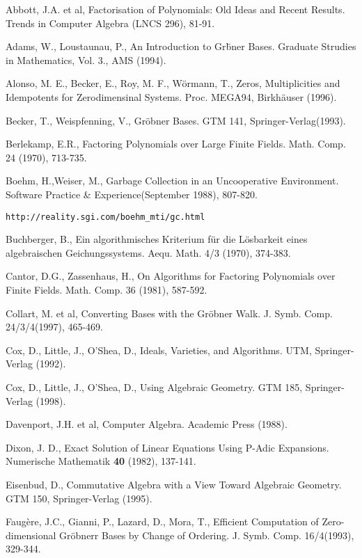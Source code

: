 \begin{thebibliography}{99}
Abbott, J.A. et al, Factorisation of Polynomials: Old Ideas and Recent Results.
Trends in Computer Algebra (LNCS 296), 81-91.

Adams, W., Loustaunau, P., An Introduction to Gr\"bner Bases. Graduate
Strudies in Mathematics, Vol. 3., AMS (1994).

Alonso, M. E., Becker, E., Roy, M. F., W\"ormann, T., Zeros,
Multiplicities and Idempotents for Zerodimensinal Systems.
Proc. MEGA94, Birkh\"auser (1996).

Becker, T., Weispfenning, V., Gr\"obner Bases. GTM 141, Springer-Verlag(1993).

Berlekamp, E.R., Factoring Polynomials over Large Finite Fields.
Math. Comp. 24 (1970), 713-735.

Boehm, H.,Weiser, M., Garbage Collection in an Uncooperative Environment.
Software Practice \& Experience(September 1988), 807-820.

{\tt http://reality.sgi.com/boehm\_mti/gc.html}

Buchberger, B., Ein algorithmisches Kriterium {f\"ur} die
{L\"osbarkeit} eines algebraischen Geichungssystems. Aequ. Math. 4/3
(1970), 374-383.

Cantor, D.G., Zassenhaus, H., On Algorithms for Factoring
Polynomials over Finite Fields.
Math. Comp. 36 (1981), 587-592.

Collart, M. et al, Converting Bases with the Gr\"obner Walk.
J. Symb. Comp. 24/3/4(1997), 465-469.

Cox, D., Little, J., O'Shea, D., Ideals, Varieties, and Algorithms. 
UTM, Springer-Verlag (1992).

Cox, D., Little, J., O'Shea, D., Using Algebraic Geometry.
GTM 185, Springer-Verlag (1998).

Davenport, J.H. et al, Computer Algebra. Academic Press (1988).

Dixon, J. D., Exact Solution of Linear Equations Using P-Adic Expansions.
Numerische Mathematik {\bf 40} (1982), 137-141.

Eisenbud, D., Commutative Algebra with a View Toward Algebraic Geometry.
GTM 150, Springer-Verlag (1995).

Faug\`ere, J.C., Gianni, P., Lazard, D., Mora, T., Efficient
Computation of Zero-dimensional Gr\"obnerr Bases by Change of Ordering. J. 
Symb. Comp. 16/4(1993), 329-344.


\end{thebibliography}
